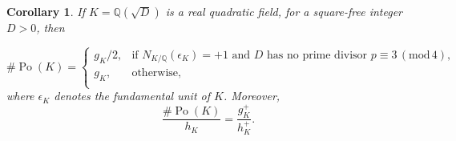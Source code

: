 \documentclass[12pt]{amsart}
\newtheorem{corollary}[theorem]{Corollary}
\theoremstyle{definition}
\numberwithin{equation}{section}
\DeclareMathOperator{\Po}{Po}
\begin{document}
\begin{corollary} \label{corollary, Po(K),gK and gK+ real quadratic}       
If $K=\mathbb{Q}(\sqrt{D})$ is a real quadratic field, for a  square-free integer $D>0$, then


\begin{equation} \label{equation, Po(K) and gK for K real quadratic}
	\# \Po(K)=
	\left\{
	\begin{array}{ll}
		g_K/2, &  \text{if $N_{K/\mathbb{Q}}(\epsilon_K)=+1$ and  $D$ has no prime divisor $p \equiv 3 \, (\mathrm{mod}\, 4)$},\\
		g_K,  &  \text{otherwise},\\
	\end{array}
	\right.
\end{equation}
where $\epsilon_K$ denotes the fundamental unit of $K$. Moreover,
\begin{equation} \label{equation, Po(K), hK, hK+ for K real quadratic}
	\frac{\# \Po(K)}{h_K}=\frac{g_K^+}{h_K^+}.
\end{equation}
\end{corollary}
\end{document}
